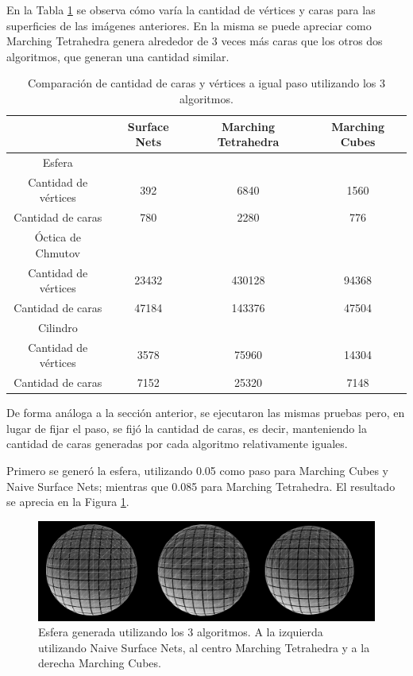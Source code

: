 \documentclass[12pt]{article}
\begin{document}
En la Tabla \ref{cip} se observa cómo varía la cantidad de vértices y caras para las superficies de las imágenes anteriores. En la misma se puede apreciar como Marching Tetrahedra genera alrededor de 3 veces más caras que los otros dos algoritmos, que generan una cantidad similar.
\clearpage
\begin{table}[h!]
  \centering
  \begin{tabular}{cccc}
    \toprule
    & Surface Nets & Marching Tetrahedra & Marching Cubes\\
    \midrule
    Esfera&&&\\
    Cantidad de vértices & 392 & 6840 & 1560\\
    Cantidad de caras & 780 & 2280 & 776\\
\hline
     Óctica de Chmutov&&&\\
     Cantidad de vértices & 23432 & 430128 & 94368\\
    Cantidad de caras & 47184 & 143376 & 47504\\
\hline
     Cilindro&&&\\
    Cantidad de vértices & 3578 & 75960 & 14304\\
    Cantidad de caras & 7152 & 25320 & 7148\\
\bottomrule
  \end{tabular}
  \caption{Comparación de cantidad de caras y vértices a igual paso utilizando los 3 algoritmos.}
  \label{cip}
\end{table}

De forma análoga a la sección anterior, se ejecutaron las mismas pruebas pero, en lugar de fijar el paso, se fijó la cantidad de caras, es decir, manteniendo la cantidad de caras generadas por cada algoritmo relativamente iguales.

Primero se generó la esfera, utilizando 0.05 como paso para Marching Cubes y Naive Surface Nets; mientras que 0.085 para Marching Tetrahedra. El resultado se aprecia en la Figura \ref{esfera22G}.

\begin{figure}[h!]
\includegraphics[width=\linewidth,center]{esfera2.png}
\caption{Esfera generada utilizando los 3 algoritmos.  A la izquierda utilizando Naive Surface Nets, al centro Marching Tetrahedra y a la derecha Marching Cubes.}
\label{esfera22G}
\end{figure}
\end{document}
